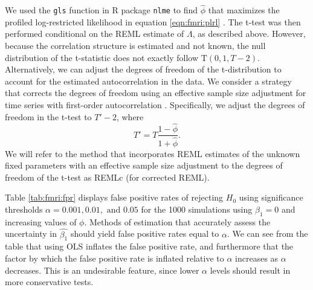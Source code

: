 We used the {\tt gls} function in R package {\tt nlme} to find $\hat{\phi}$ that maximizes the profiled log-restricted likelihood in equation \eqref{eqn:fmri:plrl} \citep{pin:bates:mixed:2000}. The t-test was then performed conditional on the REML estimate of $\Lambda$, as described above. However, because the correlation structure is estimated and not known, the null distribution of the t-statistic does not exactly follow $\mbox{T}(0,1,T-2)$. Alternatively, we can adjust the degrees of freedom of the t-distribution to account for the estimated autocorrelation in the data. We consider a strategy that corrects the degrees of freedom using an effective sample size adjustment for time series with first-order autocorrelation \citep{dawdy:matalas:ess:1964}. Specifically, we adjust the degrees of freedom in the t-test to $T' - 2$, where
\begin{equation}
T' = T\frac{1-\hat{\phi}}{1+\hat{\phi}}. \label{eqn:fmri:ess}
\end{equation}
We will refer to the method that incorporates REML estimates of the unknown fixed parameters with an effective sample size adjustment to the degrees of freedom of the t-test as REMLc (for corrected REML).

Table \ref{tab:fmri:fpr} displays false positive rates of rejecting $H_0$ using significance thresholds $\alpha = 0.001, 0.01, \mbox{ and } 0.05$ for the 1000 simulations using $\beta_1 = 0$ and increasing values of $\phi$. Methods of estimation that accurately assess the uncertainty in $\hat{\beta_1}$ should yield false positive rates equal to $\alpha$. We can see from the table that using OLS inflates the false positive rate, and furthermore that the factor by which the false positive rate is inflated relative to $\alpha$ increases as $\alpha$ decreases. This is an undesirable feature, since lower $\alpha$ levels should result in more conservative tests.

